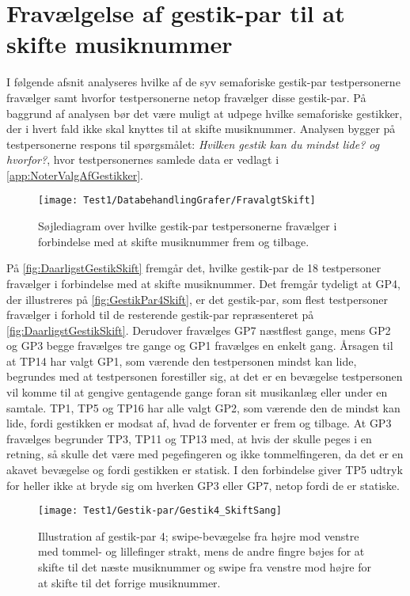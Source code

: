 \section{Fravælgelse af gestik-par til at skifte musiknummer}
\label{app:TestresultaterSkiftDaarlig}
%
I følgende afsnit analyseres hvilke af de syv semaforiske gestik-par testpersonerne fravælger samt hvorfor testpersonerne netop fravælger disse gestik-par. På baggrund af analysen bør det være muligt at udpege hvilke semaforiske gestikker, der i hvert fald ikke skal knyttes til at skifte musiknummer. Analysen bygger på testpersonerne respons til spørgsmålet: \textit{Hvilken gestik kan du mindst lide? og hvorfor?}, hvor testpersonernes samlede data er vedlagt i \autoref{app:NoterValgAfGestikker}.
%
\begin{figure}[H]
	\centering
	\texttt{[image: Test1/DatabehandlingGrafer/FravalgtSkift]}
	\caption{Søjlediagram over hvilke gestik-par testpersonerne fravælger i forbindelse med at skifte musiknummer frem og tilbage.}
	\label{fig:DaarligstGestikSkift}
\end{figure}
\noindent
%
På \autoref{fig:DaarligstGestikSkift} fremgår det, hvilke gestik-par de 18 testpersoner fravælger i forbindelse med at skifte musiknummer. Det fremgår tydeligt at GP4, der illustreres på \autoref{fig:GestikPar4Skift}, er det gestik-par, som flest testpersoner fravælger i forhold til de resterende gestik-par repræsenteret på \autoref{fig:DaarligstGestikSkift}. Derudover fravælges GP7 næstflest gange, mens GP2 og GP3 begge fravælges tre gange og GP1 fravælges en enkelt gang. Årsagen til at TP14 har valgt GP1, som værende den testpersonen mindst kan lide, begrundes med at testpersonen forestiller sig, at det er en bevægelse testpersonen vil komme til at gengive gentagende gange foran sit musikanlæg eller under en samtale. TP1, TP5 og TP16 har alle valgt GP2, som værende den de mindst kan lide, fordi gestikken er modsat af, hvad de forventer er frem og tilbage. At GP3 fravælges begrunder TP3, TP11 og TP13 med, at hvis der skulle peges i en retning, så skulle det være med pegefingeren og ikke tommelfingeren, da det er en akavet bevægelse og fordi gestikken er statisk. I den forbindelse giver TP5 udtryk for heller ikke at bryde sig om hverken GP3 eller GP7, netop fordi de er statiske.
%
\begin{figure}[H]
	\centering
	\texttt{[image: Test1/Gestik-par/Gestik4\_SkiftSang]}
	\caption{Illustration af gestik-par 4; swipe-bevægelse fra højre mod venstre med tommel- og lillefinger strakt, mens de andre fingre bøjes for at skifte til det næste musiknummer og swipe fra venstre mod højre for at skifte til det forrige musiknummer.}
	\label{fig:GestikPar4Skift}
\end{figure}
